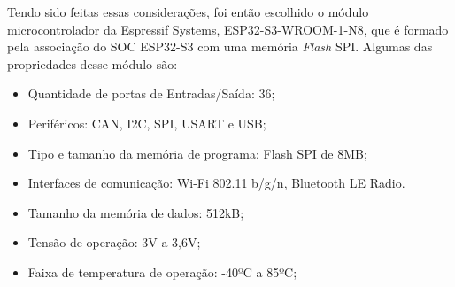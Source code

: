Tendo sido feitas essas considerações, foi então escolhido o módulo microcontrolador da Espressif Systems, ESP32-S3-WROOM-1-N8, que é formado pela associação do \gls{SOC} ESP32-S3 com uma memória \textit{Flash} \gls{SPI}. Algumas das propriedades desse módulo são:

    \begin{itemize}
        \item Quantidade de portas de Entradas/Saída: 36;
        \item Periféricos: CAN, I2C, SPI, USART e USB;
        \item Tipo e tamanho da memória de programa: Flash SPI de 8MB;
        \item Interfaces de comunicação: Wi-Fi 802.11 b/g/n, Bluetooth LE Radio.
        \item Tamanho da memória de dados: 512kB;
        \item Tensão de operação: 3V a 3,6V;
        \item Faixa de temperatura de operação: -40ºC a 85ºC;
    \end{itemize}
    
    
    \begin{figure}[h!]
            \captionsetup{width=16cm}
   \end{figure}    
    
